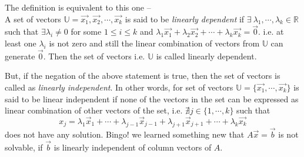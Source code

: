 \documentclass{article}
\begin{document}
The definition is equivalent to this one -- \\
A set of vectors $\mathbb{U} = {\vec{x_1}, \vec{x_2}, \cdots, \vec{x_k}}$ is said to be \textit{linearly dependent} if $\exists~\lambda_1, \cdots, \lambda_k \in \mathbb{R}$ such that $\exists \lambda_i \neq 0$ for some $1 \leq i \leq k$ and $\lambda_1\vec{x_1} + \lambda_2\vec{x_2} + \cdots + \lambda_k\vec{x_k} = \vec{0}$. i.e. at least one $\lambda_i$ is not zero and still the linear combination of vectors from $\mathbb{U}$ can generate $\vec{0}$. Then the set of vectors i.e. $\mathbb{U}$ is called linearly dependent.

But, if the negation of the above statement is true, then the set of vectors is called as \textit{linearly independent}. In other words, for set of vectors $\mathbb{U} = \{\vec{x_1}, \cdots, \vec{x_k}\}$ is said to be linear independent if none of the  vectors in the set can be expressed as linear combination of other vectors of the set, i.e. \(\nexists j \in\{1, \cdots, k\}\)  such that
    \begin{equation} \label{aa}
        x_j = \lambda_1\vec{x}_1 + \cdots + \lambda_{j-1}\vec{x}_{j-1} + \lambda_{j+1}\vec{x}_{j+1} + \cdots + \lambda_k\vec{x_k}
    \end{equation}
    does not have any solution. Bingo! we learned something new that $A\vec{x} =\vec{b}$ is not solvable, if $\vec{b}$ is linearly independent of column vectors of $A$.
    
\end{document}

